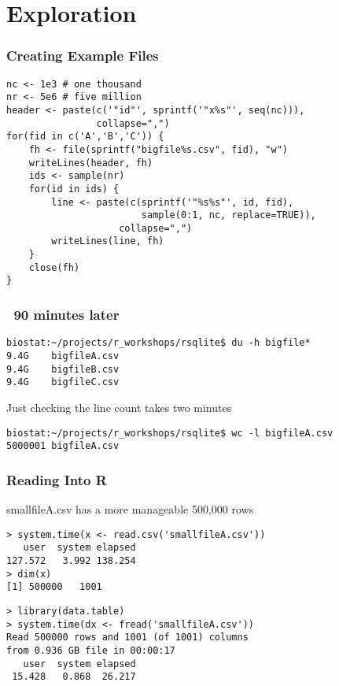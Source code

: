 \documentclass{beamer}
\begin{document}
\section{Exploration}

\begin{frame}[fragile=singleslide]
\frametitle{Creating Example Files}
\begin{verbatim}
nc <- 1e3 # one thousand
nr <- 5e6 # five million
header <- paste(c('"id"', sprintf('"x%s"', seq(nc))),
                collapse=",")
for(fid in c('A','B','C')) {
    fh <- file(sprintf("bigfile%s.csv", fid), "w")
    writeLines(header, fh)
    ids <- sample(nr)
    for(id in ids) {
        line <- paste(c(sprintf('"%s%s"', id, fid), 
                        sample(0:1, nc, replace=TRUE)),
                    collapse=",")
        writeLines(line, fh)
    }
    close(fh)
}
\end{verbatim}
\end{frame}

\begin{frame}[fragile=singleslide]
\frametitle{~90 minutes later}
\begin{verbatim}
biostat:~/projects/r_workshops/rsqlite$ du -h bigfile*
9.4G    bigfileA.csv
9.4G    bigfileB.csv
9.4G    bigfileC.csv
\end{verbatim}

Just checking the line count takes two minutes

\begin{verbatim}
biostat:~/projects/r_workshops/rsqlite$ wc -l bigfileA.csv
5000001 bigfileA.csv
\end{verbatim}
\end{frame}

\begin{frame}[fragile=singleslide]
\frametitle{Reading Into R}

smallfileA.csv has a more manageable 500,000 rows

\begin{verbatim}
> system.time(x <- read.csv('smallfileA.csv'))
   user  system elapsed 
127.572   3.992 138.254 
> dim(x)
[1] 500000   1001
\end{verbatim}

\begin{verbatim}
> library(data.table)
> system.time(dx <- fread('smallfileA.csv'))
Read 500000 rows and 1001 (of 1001) columns
from 0.936 GB file in 00:00:17
   user  system elapsed 
 15.428   0.868  26.217
\end{verbatim}
\end{frame}
\end{document}

